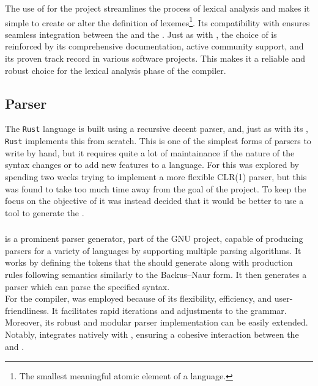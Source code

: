 The use of \lexerGen{} for the \lang{} project streamlines the process of lexical
analysis and makes it simple to create or alter the definition of
lexemes\footnote{The smallest meaningful atomic element of a language.}. Its
compatibility with \parserGen{} ensures seamless integration between the \lexer{} and
the \parser. Just as with \parserGen, the choice of \lexerGen{} is reinforced by its
comprehensive documentation, active community support, and its proven track record in
various software projects. This makes it a reliable and robust choice for the lexical
analysis phase of the \lang{} compiler.

\subsection{Parser}
\label{sec:techParser}

The \texttt{Rust} language is built using a recursive decent parser, and, just as
with its \lexer{}, \texttt{Rust} implements this from
scratch\cite{RUST-COMPILER-SRC}. This is one of the simplest forms of parsers to
write by hand, but it requires quite a lot of maintainance if the nature of the
syntax changes or to add new features to a language. For \lang{} this was explored by
spending two weeks trying to implement a more flexible CLR(1) parser, but this was
found to take too much time away from the goal of the project. To keep the focus on
the objective of \lang{} it was instead decided that it would be better to use a tool
to generate the \parser{}.

\subsubsection{\parserGen{}}
\label{sec:bison}

\parserGen{} is a prominent parser generator, part of the GNU project, capable of
producing parsers for a variety of languages by supporting multiple parsing
algorithms\cite{BISON}. 
It works by defining the tokens that the \lexer{} should generate along with production rules
following semantics similarly to the Backus–Naur form\cite{BNF}. It then generates a
parser which can parse the specified syntax.\\

For the \lang{} compiler, \parserGen{} was employed because of its flexibility,
efficiency, and user-friendliness. It facilitates rapid iterations and adjustments to
the grammar. Moreover, its robust and modular parser implementation can be easily
extended. Notably, \parserGen{} integrates natively with \lexerGen{}, ensuring a
cohesive interaction between the \lexer{} and \parser{}. \\

